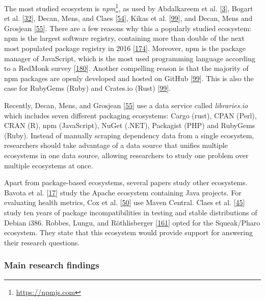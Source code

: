 \documentclass[]{book}
\let\rmarkdownfootnote\footnote%
\def\footnote{\protect\rmarkdownfootnote}
\begin{document}
The most studied ecosystem is \emph{npm}\footnote{\url{https://npmjs.com}},
as used by Abdalkareem et al.
{[}\protect\hyperlink{ref-Abdalkareem2017}{3}{]}, Bogart et al.
{[}\protect\hyperlink{ref-Bogart2016}{32}{]}, Decan, Mens, and Claes
{[}\protect\hyperlink{ref-Decan2017}{54}{]}, Kikas et al.
{[}\protect\hyperlink{ref-Kikas2017}{99}{]}, and Decan, Mens and
Grosjean {[}\protect\hyperlink{ref-Decan2018}{55}{]}. There are a few
reasons why this a popularly studied ecosystem: npm is the largest
software registry, containing more than double of the next most
populated package registry in 2016
{[}\protect\hyperlink{ref-Linux2016}{174}{]}. Moreover, npm is the
package manager of JavaScript, which is the most used programming
language according to a RedMonk survey
{[}\protect\hyperlink{ref-RedMonk2018}{180}{]}. Another compelling
reason is that the majority of npm packages are openly developed and
hosted on GitHub {[}\protect\hyperlink{ref-Kikas2017}{99}{]}. This is
also the case for RubyGems (Ruby) and Crates.io (Rust)
{[}\protect\hyperlink{ref-Kikas2017}{99}{]}.

Recently, Decan, Mens, and Grosjean
{[}\protect\hyperlink{ref-Decan2018}{55}{]} use a data service called
\emph{libraries.io} which includes seven different packaging ecosystems:
Cargo (rust), CPAN (Perl), CRAN (R), npm (JavaScript), NuGet (.NET),
Packagist (PHP) and RubyGems (Ruby). Instead of manually scraping
dependency data from a single ecosystem, researchers should take
advantage of a data source that unifies multiple ecosystems in one data
source, allowing researchers to study one problem over multiple
ecosystems at once.

Apart from package-based ecosystems, several papers study other
ecosystems. Bavota et al. {[}\protect\hyperlink{ref-Bavota2014}{17}{]}
study the Apache ecosystem containing Java projects. For evaluating
health metrics, Cox et al. {[}\protect\hyperlink{ref-Cox2015}{50}{]} use
Maven Central. Claes et al. {[}\protect\hyperlink{ref-Claes2015}{45}{]}
study ten years of package incompatibilities in testing and stable
distributions of Debian i386. Robbes, Lungu, and Röthlisberger
{[}\protect\hyperlink{ref-Robbes2012}{161}{]} opted for the Squeak/Pharo
ecosystem. They state that this ecosystem would provide support for
answering their research questions.

\subsubsection{Main research findings}\label{main-research-findings}
\end{document}
